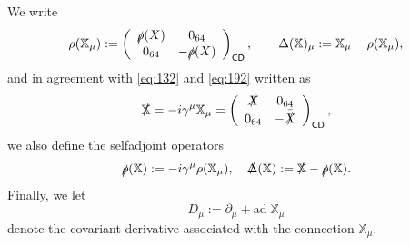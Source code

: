 \documentclass[11pt]{article}
\newcommand{\XX}{{\mathbb X}}
\newcommand{\del}{\partial}
\newcommand{\sC}{\mathsf C}
\newcommand{\sD}{\mathsf D}
\begin{document}
We write
\begin{equation}
  \label{eq:166}
  \rho(\mathbb X_\mu) := \left(
\begin{array}{cc} 
  \slashed\rho(X) & 0_{64} \\
  0_{64}&-\slashed\rho(\bar X)
\end{array}\right)_{\sC\sD},\quad\quad
  \Delta(\XX)_\mu := \XX_\mu - \rho(\XX_\mu),
\end{equation}
and in agreement with  \eqref{eq:132} and \eqref{eq:192} written as
\begin{equation}
  \label{eq:1999}
  \slashed\XX = -i \gamma^\mu {\mathbb X}_\mu = \left(
    \begin{array}{cc}
      \slashed X & 0_{64} \\
      0_{64}&-\bar{\slashed X}\end{array}\right)_{\sC\sD},
\end{equation}
we also define the selfadjoint operators
\begin{equation}
  \label{eq:199}
  \slashed\rho(\XX) :=-i\gamma^\mu \rho(\XX_\mu), \quad \slashed\Delta(\XX) := \slashed\XX - \slashed\rho(\XX).
\end{equation}
Finally,  we let
\begin{equation}
  \label{eq:177}
  D_\mu := \del_\mu + \text{ad}\; \XX_\mu
\end{equation}
denote the covariant derivative associated with the connection $\XX_\mu$.
\end{document}
